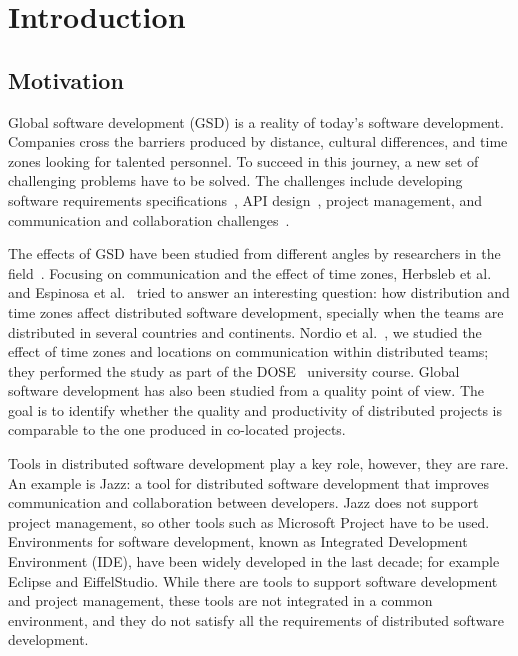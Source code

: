 \section{Introduction}

\subsection{Motivation}

 Global software development (GSD) is a reality of today's software development. Companies cross the
 barriers produced by distance, cultural differences, and time zones looking for talented personnel.  
 To succeed in this journey, a new set of challenging problems have to be solved. 
 The challenges include developing software requirements specifications~\cite{Meyer85},
 API design~\cite{NordioMitinMeyerGhezziNittoTamburelli09}, project management, and communication and collaboration
 challenges~\cite{HerbslebMockusETAL00,NordioETAL11}. 


 The effects of GSD have been studied from different angles by researchers in the 
 field~\cite{Carmel1999, NordioETAL11, EstlerNordioFuriaMeyerSchneider12, HolmstromConchuirAgerfalkFitzgerald06, HerbslebMoitra01}. 
 Focusing on communication and the effect of time zones,
 Herbsleb et al.~\cite{HerbslebMockusETAL00} and Espinosa et al.~\cite{EspinosaNingErran07} tried to answer an interesting
 question: how distribution and time zones affect
 distributed software development, specially when the teams are distributed 
 in several countries and continents. 
Nordio et al.~\cite{NordioETAL11}, we studied the effect of time zones and locations on communication 
within distributed teams; they performed the study as part of the DOSE~\cite{NordioMitinMeyer2010,NordioDOSE2011} university course.
Global software development has also been studied from a quality point of view.
 The goal is to identify whether the quality and productivity of distributed projects is comparable to the one produced
 in co-located projects. 
 
 Tools in distributed software development play a key role, however, they are rare. An example is Jazz: a tool for distributed 
 software development that improves 
 communication and collaboration between developers. Jazz does not support project management, so other tools such as 
 Microsoft Project have to be used. Environments for software development, known as Integrated Development Environment (IDE), have been 
 widely developed in the last decade; for example Eclipse and EiffelStudio. While there are tools to support software development 
 and project management, these tools are not integrated in a common environment, and they do not satisfy all the 
 requirements of distributed software development.
 
